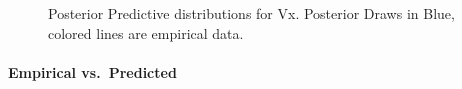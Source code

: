 \documentclass[
  letterpaper,
  DIV=11,
  numbers=noendperiod]{scrartcl}
\let\oldparagraph\paragraph
\renewcommand{\paragraph}[1]{\oldparagraph{#1}\mbox{}}
\begin{document}
\begin{figure}[H]


\caption{\label{fig-post-pred-vx}Posterior Predictive distributions for
Vx. Posterior Draws in Blue, colored lines are empirical data.}

\end{figure}%

\paragraph{Empirical vs.~Predicted}\label{empirical-vs.-predicted}
\end{document}
